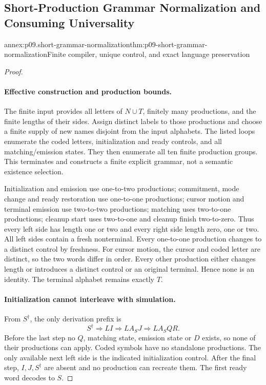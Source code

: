 \subsection{Short-Production Grammar Normalization and Consuming Universality}
\label{annex:p09-short-grammar-normalization}

\begin{annexitem}{annex:p09.short-grammar-normalization}{thm:p09-short-grammar-normalization}{Finite compiler, unique control, and exact language preservation}
\begin{proof}
\paragraph{Effective construction and production bounds.}
The finite input provides all letters of \(N\cup T\), finitely many
productions, and the finite lengths of their sides. Assign distinct labels
to those productions and choose a finite supply of new names disjoint from
the input alphabets. The listed loops enumerate the coded letters,
initialization and ready controls, and all matching/emission states. They
then enumerate all ten finite production groups. This terminates and
constructs a finite explicit grammar, not a semantic existence selection.

Initialization and emission use one-to-two productions; commitment, mode
change and ready restoration use one-to-one productions; cursor motion and
terminal emission use two-to-two productions; matching uses two-to-one
productions; cleanup start uses two-to-one and cleanup finish two-to-zero.
Thus every left side has length one or two and every right side length
zero, one or two. All left sides contain a fresh nonterminal.
Every one-to-one production changes to a distinct control by freshness.
For cursor motion, the cursor and coded letter are distinct, so the two
words differ in order. Every other production either changes length or
introduces a distinct control or an original terminal. Hence none is an
identity. The terminal alphabet remains exactly \(T\).

\paragraph{Initialization cannot interleave with simulation.}
From \(S^\dagger\), the only derivation prefix is
\[
 S^\dagger\Longrightarrow LI
 \Longrightarrow LA_SJ
 \Longrightarrow LA_SQR.
\]
Before the last step no \(Q\), matching state, emission state or \(D\)
exists, so none of their productions can apply. Coded symbols have no
standalone productions. The only available next left side is the indicated
initialization control. After the final step, \(I,J,S^\dagger\) are absent
and no production can recreate them. The first ready word decodes to \(S\).


\end{proof}
\end{annexitem}
